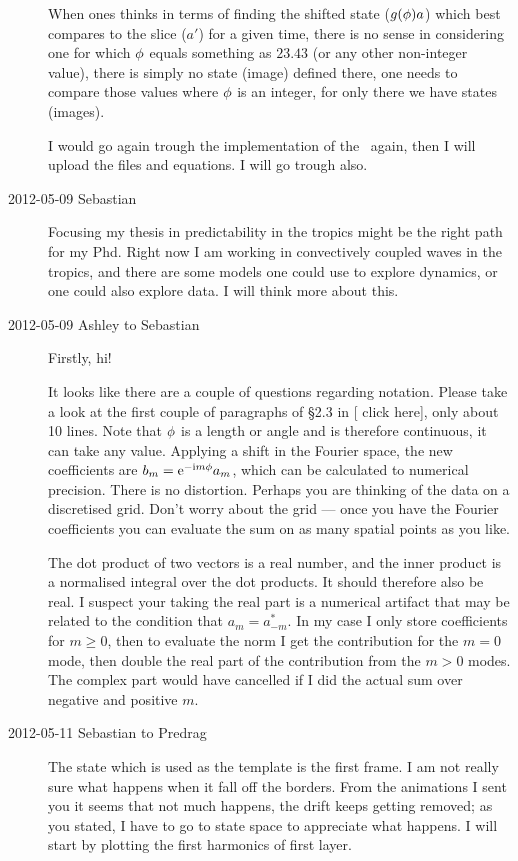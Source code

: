 \begin{description}
When ones thinks in terms of finding the shifted state ($g({\bf \phi})
a$) which best compares to the slice ($a'$) for a given time, there is no
sense in considering one for which ${\bf \phi}$ equals something as $23.43$
(or any other non-integer value), there is simply no state (image)
defined there, one needs to compare those values where ${\bf \phi}$ is an
integer, for only there we have states (images).

I would go again trough the implementation of the \chartBord\ again,
then I will upload the files and equations. I will go trough
 also.

\item[2012-05-09 Sebastian]
Focusing my thesis in predictability in the tropics might be the right
path for my Phd. Right now I am working in convectively coupled waves in
the tropics, and there are some models one could use to explore dynamics,
or one could also explore data. I will think more about this.

\item[2012-05-09 Ashley to Sebastian]
Firstly, hi!

It looks like there are a couple of questions regarding notation.
Please take a look at the first couple of paragraphs of \S2.3 in
\rf{ACHKW11}
[
{click here}],
only about 10 lines. Note that ${\bf \phi}$ is a length or angle and is
therefore continuous, it can take any value. Applying a shift in the
Fourier space, the new coefficients are
$b_m=\mathrm{e}^{-\mathrm{i}m{\bf \phi}}a_m$, which can be calculated to
numerical precision. There is no distortion. Perhaps you are thinking of
the data on a discretised grid.  Don't worry about the grid --- once you
have the Fourier coefficients you can evaluate the sum on as many spatial
points as you like.

The dot product of two vectors is a real number, and the inner product is
a normalised integral over the dot products.  It should therefore also be
real.  I suspect your taking the real part is a numerical artifact that
may be related to the condition that $a_m=a^*_{-m}$.  In my case I only
store coefficients for $m\ge 0$, then to evaluate the norm I get the
contribution for the $m=0$ mode, then double the real part of the
contribution from the $m>0$ modes.  The complex part would have cancelled
if I did the actual sum over negative and positive $m$.

\item[2012-05-11 Sebastian to Predrag]
The state which is used as the template is the first frame. I am not
really sure what happens when it fall off the borders. From the
animations I sent you it seems that not much happens, the drift keeps
getting removed; as you stated, I have to go to state space to appreciate
what happens. I will start by plotting the first harmonics of first
layer.


\end{description}
